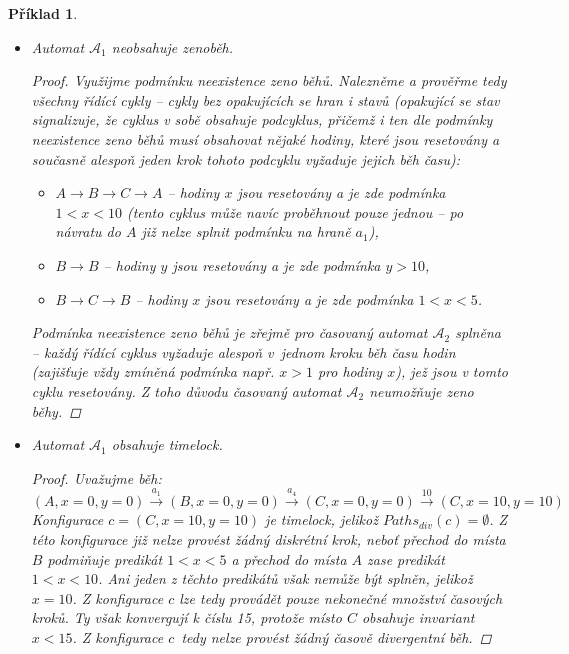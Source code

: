 \documentclass[a4paper]{article}
\theoremstyle{task}
\newtheorem{task}{Příklad}
\begin{document}
\begin{task}
    \begin{itemize}



        \item Automat $\mathcal{A}_1$ neobsahuje zenoběh.

        \begin{proof}
            Využijme podmínku neexistence zeno běhů. Nalezněme a prověřme tedy všechny řídící cykly -- cykly bez opakujících se hran i stavů (opakující se stav signalizuje, že cyklus v sobě obsahuje podcyklus, přičemž i ten dle podmínky neexistence zeno běhů musí obsahovat nějaké hodiny, které jsou resetovány a současně alespoň jeden krok tohoto podcyklu vyžaduje jejich běh času):

            \begin{itemize}
                \item $A \to B \to C \to A$ -- hodiny $x$ jsou resetovány a je zde podmínka $1 < x < 10$ (tento cyklus může navíc proběhnout pouze jednou -- po návratu do $A$ již nelze splnit podmínku na hraně $a_1$),
                \item $B \to B $ -- hodiny $y$ jsou resetovány  a je zde podmínka $y > 10$,
                \item $B \to C \to B$ -- hodiny $x$ jsou resetovány  a je zde podmínka $1 < x < 5$.
            \end{itemize}

            Podmínka neexistence zeno běhů je zřejmě pro časovaný automat $\mathcal{A}_2$ splněna -- každý řídící cyklus vyžaduje alespoň v~jednom kroku běh času hodin (zajišťuje vždy zmíněná podmínka např. $x > 1$ pro hodiny $x$), jež jsou v tomto cyklu resetovány. Z toho důvodu časovaný automat $\mathcal{A}_2$ neumožňuje zeno běhy.
        \end{proof}



        \item Automat $\mathcal{A}_1$ obsahuje timelock.

        \begin{proof}
            Uvažujme běh:
            $$(A, x = 0, y = 0) \xrightarrow{a_1} (B, x = 0, y = 0) \xrightarrow{a_4} (C, x = 0, y = 0) \xrightarrow{10} (C, x = 10, y = 10)$$
            Konfigurace $c = (C, x = 10, y = 10)$ je timelock, jelikož $\mathit{Paths}_\mathit{div}(c) = \emptyset$. Z této konfigurace již nelze provést žádný diskrétní krok, neboť přechod do místa $B$ podmiňuje predikát $1 < x < 5$ a přechod do místa $A$ zase predikát $1 < x < 10$. Ani jeden z těchto predikátů však nemůže být splněn, jelikož $x = 10$. Z konfigurace $c$ lze tedy provádět pouze nekonečné množství časových kroků. Ty však konvergují k číslu 15, protože místo $C$ obsahuje invariant $x < 15$. Z konfigurace $c$~tedy nelze provést žádný časově divergentní běh.
        \end{proof}
        
    \end{itemize}
\end{task}
\end{document}
